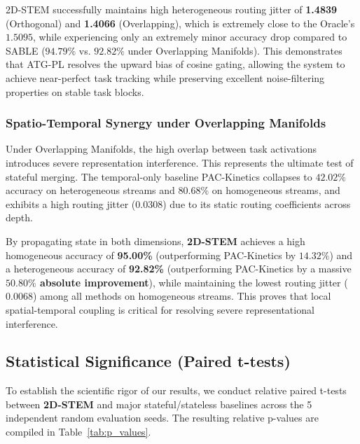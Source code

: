2D-STEM successfully maintains high heterogeneous routing jitter of \textbf{1.4839} (Orthogonal) and \textbf{1.4066} (Overlapping), which is extremely close to the Oracle's $1.5095$, while experiencing only an extremely minor accuracy drop compared to SABLE ($94.79\%$ vs. $92.82\%$ under Overlapping Manifolds). This demonstrates that ATG-PL resolves the upward bias of cosine gating, allowing the system to achieve near-perfect task tracking while preserving excellent noise-filtering properties on stable task blocks.

\subsubsection{Spatio-Temporal Synergy under Overlapping Manifolds}
Under Overlapping Manifolds, the high overlap between task activations introduces severe representation interference. This represents the ultimate test of stateful merging. The temporal-only baseline PAC-Kinetics collapses to $42.02\%$ accuracy on heterogeneous streams and $80.68\%$ on homogeneous streams, and exhibits a high routing jitter ($0.0308$) due to its static routing coefficients across depth. 

By propagating state in both dimensions, \textbf{2D-STEM} achieves a high homogeneous accuracy of \textbf{95.00\%} (outperforming PAC-Kinetics by $14.32\%$) and a heterogeneous accuracy of \textbf{92.82\%} (outperforming PAC-Kinetics by a massive \textbf{$50.80\%$ absolute improvement}), while maintaining the lowest routing jitter ($0.0068$) among all methods on homogeneous streams. This proves that local spatial-temporal coupling is critical for resolving severe representational interference.

\subsection{Statistical Significance (Paired t-tests)}
To establish the scientific rigor of our results, we conduct relative paired t-tests between \textbf{2D-STEM} and major stateful/stateless baselines across the 5 independent random evaluation seeds. The resulting relative p-values are compiled in Table~\ref{tab:p_values}.

